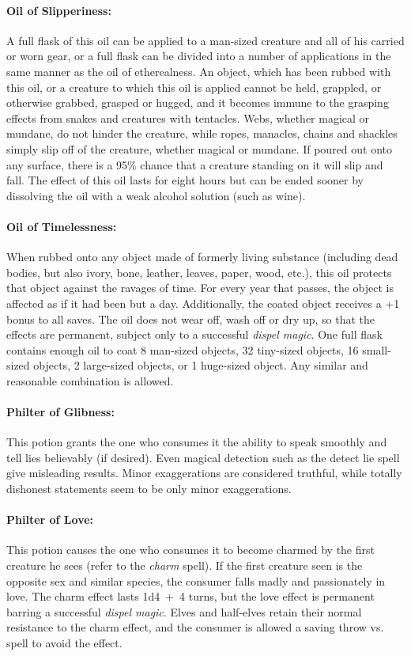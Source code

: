 \begin{multicols}{2}
\paragraph{Oil of Slipperiness:} A full flask of this oil can be applied to a man-sized creature and all of his carried or worn gear, or a full flask can be divided into a number of applications in the same manner as the oil of etherealness.  An object, which has been rubbed with this oil, or a creature to which this oil is applied cannot be held, grappled, or otherwise grabbed, grasped or hugged, and it becomes immune to the grasping effects from snakes and creatures with tentacles.  Webs, whether magical or mundane, do not hinder the creature, while ropes, manacles, chains and shackles simply slip off of the creature, whether magical or mundane.  If poured out onto any surface, there is a 95\% chance that a creature standing on it will slip and fall.  The effect of this oil lasts for eight hours but can be ended sooner by dissolving the oil with a weak alcohol solution (such as wine). 

\paragraph{Oil of Timelessness:}  When rubbed onto any object made of formerly living substance (including dead bodies, but also ivory, bone, leather, leaves, paper, wood, etc.), this oil protects that object against the ravages of time.  For every year that passes, the object is affected as if it had been but a day.  Additionally, the coated object receives a +1 bonus to all saves.  The oil does not wear off, wash off or dry up, so that the effects are permanent, subject only to a successful \textit{dispel magic}.  One full flask contains enough oil to coat 8 man-sized objects, 32 tiny-sized objects, 16 small-sized objects, 2 large-sized objects, or 1 huge-sized object.  Any similar and reasonable combination is allowed.

\paragraph{Philter of Glibness:} This potion grants the one who consumes it the ability to speak smoothly and tell lies believably (if desired).  Even magical detection such as the detect lie spell give misleading results.  Minor exaggerations are considered truthful, while totally dishonest statements seem to be only minor exaggerations.

\paragraph{Philter of Love:} This potion causes the one who consumes it to become charmed by the first creature he sees (refer to the \textit{charm} spell).  If the first creature seen is the opposite sex and similar species, the consumer falls madly and passionately in love.  The charm effect lasts 1d4~+~4 turns, but the love effect is permanent barring a successful \textit{dispel magic}.  Elves and half-elves retain their normal resistance to the charm effect, and the consumer is allowed a saving throw vs. spell to avoid the effect.


\end{multicols}
